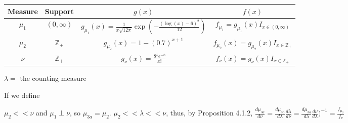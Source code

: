 \documentclass[12pt,letterpaper, onecolumn]{exam}
\newcommand{\integer}{\mathbb{Z}}
\begin{document}
\begin{questions}
\setlength{\tabcolsep}{10pt} %
\renewcommand{\arraystretch}{1.5} %
        \begin{table}[h!]
            \centering
            \begin{tabular}{|c|c|c|c|}
            \hline
            \textbf{Measure} & \textbf{Support} & $g(x)$ & $f(x)$ \\
            \hline
            $\mu_1$ &  $(0, \infty)$ & $g_{\mu_1}(x) = \frac{1}{x \sqrt{12 \pi}}\exp\left(-\frac{(\log(x) - 6)^2}{12}\right)$ & $f_{\mu_1} = g_{\mu_1}(x)I_{x \in (0, \infty)}$\\
            \hline
            $\mu_2$ & $\integer_+$ & $g_{\mu_2}(x) = 1 - (0.7)^{x +1}$ & $f_{\mu_2}(x) = g_{\mu_2}(x)I_{x \in \integer_+}$\\
            \hline
            $\nu$ & $\integer_+$ & $g_{\nu}(x) = \frac{8^x e^{-8}}{x!}$ & $f_{\nu}(x) = g_{\nu}(x)I_{x \in \integer_+}$\\
            \hline
            \end{tabular}
        \end{table}
        \endgroup

        $\lambda =$ the counting measure

        If we define 

        $\mu_2 << \nu$ and $\mu_1 \perp \nu$, so $\mu_{3a} = \mu_2$. 
         $\mu_2 << \lambda << \nu$, thus, by Proposition 4.1.2, $\frac{d \mu_{3a}}{d \nu} = \frac{d\mu_{3a}}{d\lambda}\frac{d\lambda}{d \nu} = \frac{d\mu_{3a}}{d\lambda}\frac{d\nu}{d \lambda})^{-1} = \frac{f_{\mu_2}}{f_\nu}$

\end{questions}
\end{document}

